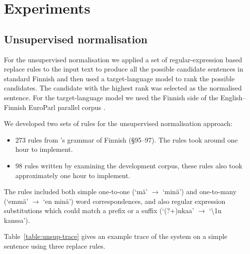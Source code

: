 \documentclass[11pt]{article}
\begin{document}
\section{Experiments}

\subsection{Unsupervised normalisation}

For the unsupervised normalisation we applied a set of regular-expression based 
replace rules to the input text to produce all the possible candidate sentences 
in standard Finnish and then used a target-language model to rank the possible 
candidates. The candidate with the highest rank was selected as the normalised sentence.
For the target-language model we used the Finnish side of the English--Finnish EuroParl
parallel corpus \cite{koehn2005}.

We developed two sets of rules for the unsupervised normalisation approach:

\begin{itemize}
  \item 273 rules from 's grammar of Finnish (\S95--97). The 
    rules took around one hour to implement.
  \item 98 rules written by examining the development corpus, these rules also
    took approximately one hour to implement.
\end{itemize}

The rules included both simple one-to-one (`m\"{a}' $\rightarrow$ `min\"{a}') and one-to-many (`emm\"{a}' $\rightarrow$ `en min\"{a}') word correspondences,
and also regular expression substitutions which could match a prefix or a suffix (`(?+)nkaa' $\rightarrow$ `\textbackslash1n kanssa').

Table~\ref{table:unsup-trace} gives an example trace of the system on a simple sentence
using three replace rules.
\end{document}

